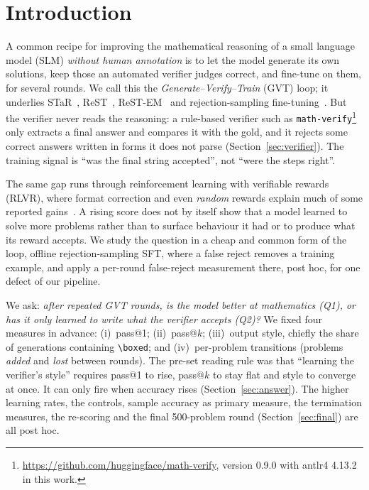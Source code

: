\documentclass[runningheads]{llncs}
\begin{document}
\section{Introduction}
\label{sec:intro}

A common recipe for improving the mathematical reasoning of a small language
model (SLM) \emph{without human annotation} is to let the model generate its own
solutions, keep those an automated verifier judges correct, and fine-tune on
them, for several rounds. We call this the \emph{Generate--Verify--Train} (GVT)
loop; it underlies STaR~\cite{ref_star}, ReST~\cite{ref_rest},
ReST-EM~\cite{ref_restem} and rejection-sampling fine-tuning~\cite{ref_rft}.
But the verifier never reads the reasoning: a rule-based verifier such as
\texttt{math-verify}\footnote{\url{https://github.com/huggingface/math-verify},
version 0.9.0 with antlr4 4.13.2 in this work.} only extracts a final answer and
compares it with the gold, and it rejects some correct answers written in forms
it does not parse (Section~\ref{sec:verifier}). The training signal is ``was the
final string accepted'', not ``were the steps right''.

The same gap runs through reinforcement learning with verifiable rewards
(RLVR), where format correction and even \emph{random} rewards explain much of
some reported gains~\cite{ref_oneshot,ref_spurious}. A rising score
does not by itself show that a model learned to solve more problems rather than to
surface behaviour it had or to produce what its reward accepts. We study the question in a cheap and common
form of the loop, offline rejection-sampling SFT, where a false reject
removes a training example, and apply a per-round false-reject
measurement there, post hoc, for one defect of our pipeline.

We ask: \emph{after repeated GVT rounds, is the model better at mathematics (Q1), or
has it only learned to write what the verifier accepts (Q2)?} We fixed four measures
in advance: (i)~pass@1; (ii)~pass@$k$; (iii)~output style, chiefly the share of
generations containing \verb|\boxed|; and (iv)~per-problem transitions
(problems \emph{added} and \emph{lost} between rounds). The pre-set reading rule
was that ``learning the verifier's style'' requires pass@1 to rise, pass@$k$ to
stay flat and style to converge at once. It can only fire when accuracy rises
(Section~\ref{sec:answer}). The higher learning rates, the
controls, sample accuracy as primary
measure, the termination measures, the re-scoring and the final 500-problem round
(Section~\ref{sec:final}) are all post hoc.
\end{document}
